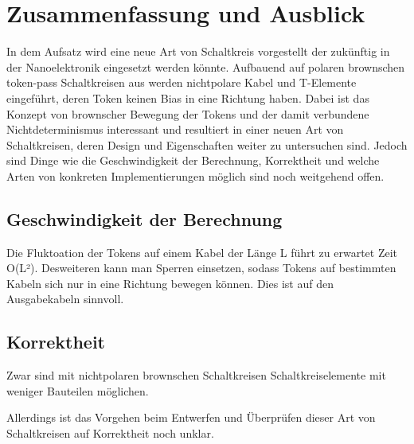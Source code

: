 \documentclass[11pt,a4paper]{article}
\begin{document}

\section{Zusammenfassung und Ausblick}
In dem Aufsatz \cite{Peper_nonPolar_2018} wird eine neue Art
von Schaltkreis vorgestellt der zukünftig in der Nanoelektronik eingesetzt
werden könnte.
%
Aufbauend auf polaren brownschen token-pass Schaltkreisen aus 
\cite{Peper_Fundamentals_2013} werden nichtpolare Kabel und T-Elemente 
eingeführt, deren Token keinen Bias in eine Richtung haben. 
%
Dabei ist das Konzept von brownscher Bewegung der Tokens und der damit
verbundene Nichtdeterminismus interessant und resultiert in einer neuen Art von
Schaltkreisen, deren Design und Eigenschaften weiter zu untersuchen sind.
%
Jedoch sind Dinge wie die Geschwindigkeit der Berechnung, Korrektheit und 
welche Arten von konkreten Implementierungen möglich sind noch weitgehend offen.


\subsection{Geschwindigkeit der Berechnung}
Die Fluktoation der Tokens auf einem Kabel der Länge L führt zu 
erwartet Zeit O(L²).
%
Desweiteren kann man Sperren einsetzen, sodass Tokens
auf bestimmten Kabeln sich nur in eine Richtung bewegen können. 
%
Dies ist auf den Ausgabekabeln sinnvoll.


\subsection{Korrektheit}
Zwar sind mit nichtpolaren brownschen Schaltkreisen Schaltkreiselemente mit
weniger Bauteilen möglichen.

%
Allerdings ist das Vorgehen beim Entwerfen und Überprüfen dieser Art von 
Schaltkreisen auf Korrektheit noch unklar. 

\end{document}

